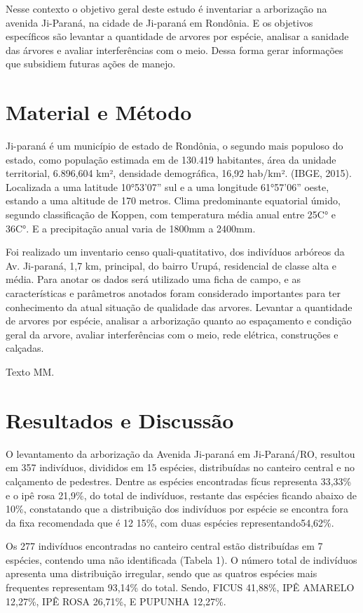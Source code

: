 \documentclass[article,12pt,onesidea,4paper,english,brazil]{abntex2}
\begin{document}
	Nesse contexto o objetivo geral deste estudo é inventariar a arborização na avenida Ji-Paraná, na cidade de Ji-paraná em Rondônia. E os objetivos específicos são levantar a quantidade de arvores por espécie, analisar a sanidade das árvores e avaliar interferências com o meio. Dessa forma gerar informações que subsidiem futuras ações de manejo.
	\section*{Material e Método}
	Ji-paraná é um município de estado de Rondônia, o segundo mais populoso do estado, como população estimada em de 130.419 habitantes, área da unidade territorial, 6.896,604 km², densidade demográfica, 16,92 hab/km². (IBGE, 2015).
	Localizada a uma latitude 10°53’07” sul e a uma longitude 61°57’06” oeste, estando a uma altitude de 170 metros. Clima predominante equatorial úmido, segundo classificação de Koppen, com temperatura média anual entre 25C° e 36C°. E a precipitação anual varia de 1800mm a 2400mm.
	
	Foi realizado um inventario censo quali-quatitativo, dos indivíduos arbóreos da Av. Ji-paraná, 1,7 km, principal, do bairro Urupá, residencial de classe alta e média. Para anotar os dados será utilizado uma ficha de campo, e as características e parâmetros anotados foram considerado importantes para ter conhecimento da atual situação de qualidade das arvores. Levantar a quantidade de arvores por espécie, analisar a arborização quanto ao espaçamento e condição geral da arvore, avaliar interferências com o meio, rede elétrica, construções e calçadas.
	
	Texto MM.
	
	\section*{Resultados e Discussão}
	
O levantamento da arborização da Avenida Ji-paraná em Ji-Paraná/RO, resultou em 357 indivíduos, divididos em 15 espécies, distribuídas no canteiro central e no calçamento de pedestres. Dentre as espécies encontradas fícus representa 33,33\% e o ipê rosa 21,9\%, do total de indivíduos, restante das espécies ficando abaixo de 10\%, constatando que a distribuição dos indivíduos por espécie se encontra fora da fixa recomendada que é 12 15\%, com duas espécies  representando54,62\%.

Os 277 indivíduos encontradas no canteiro central estão distribuídas em 7 espécies, contendo uma não identificada (Tabela 1). O número total de indivíduos apresenta uma distribuição irregular, sendo que as quatros espécies mais frequentes representam 93,14\% do total. Sendo, FICUS 41,88\%, IPÊ AMARELO 12,27\%, IPÊ ROSA 26,71\%, E PUPUNHA 12,27\%.
\end{document}
